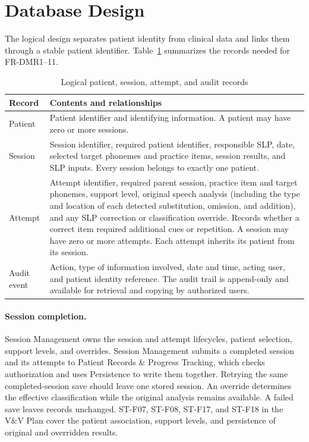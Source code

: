 \documentclass[12pt, titlepage]{article}
\begin{document}

\section{Database Design} \label{SecDatabase}

The logical design separates patient identity from clinical data and links
them through a stable patient identifier. Table~\ref{TblDatabaseRecords}
summarizes the records needed for FR-DMR1--11.

\begin{table}[H]
\centering
\begin{tabularx}{\textwidth}{@{}l X@{}}
\toprule
\textbf{Record} & \textbf{Contents and relationships}\\
\midrule
Patient & Patient identifier and identifying information. A patient may have
zero or more sessions.\\
Session & Session identifier, required patient identifier, responsible SLP,
date, selected target phonemes and practice items, session results, and SLP
inputs. Every session belongs to exactly one patient.\\
Attempt & Attempt identifier, required parent session, practice item and
target phonemes, support level, original speech analysis (including the type
and location of each detected substitution, omission, and addition), and any
SLP correction or classification override. Records whether a correct item
required additional cues or repetition. A session may have zero or more
attempts. Each attempt inherits its patient from its session.\\
Audit event & Action, type of information involved, date and time, acting
user, and patient identity reference. The audit trail is append-only and
available for retrieval and copying by authorized users.\\
\bottomrule
\end{tabularx}
\caption{Logical patient, session, attempt, and audit records}
\label{TblDatabaseRecords}
\end{table}

\paragraph{Session completion.}
Session Management owns the session and attempt lifecycles, patient
selection, support levels, and overrides. Session Management submits a
completed session and its attempts to Patient Records
\& Progress Tracking, which checks authorization and uses Persistence to
write them together.
Retrying the same completed-session save should leave one stored session.
An override determines the effective classification while the original
analysis remains available. A failed save leaves records unchanged.
ST-F07, ST-F08, ST-F17, and ST-F18 in the
V\&V Plan cover the patient association, support levels, and persistence of
original and overridden results.
\end{document}
